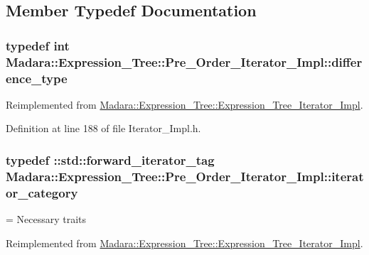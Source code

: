 \subsection{Member Typedef Documentation}
\hypertarget{classMadara_1_1Expression__Tree_1_1Pre__Order__Iterator__Impl_a4c64f0f28e72f46c878f5bae77a83f9a}{
\subsubsection[{difference\_\-type}]{\setlength{\rightskip}{0pt plus 5cm}typedef int {\bf Madara::Expression\_\-Tree::Pre\_\-Order\_\-Iterator\_\-Impl::difference\_\-type}}}
\label{d0/dfb/classMadara_1_1Expression__Tree_1_1Pre__Order__Iterator__Impl_a4c64f0f28e72f46c878f5bae77a83f9a}


Reimplemented from \hyperlink{classMadara_1_1Expression__Tree_1_1Expression__Tree__Iterator__Impl_ae0238cb942a1398b7cd91dffe4c5ba3c}{Madara::Expression\_\-Tree::Expression\_\-Tree\_\-Iterator\_\-Impl}.



Definition at line 188 of file Iterator\_\-Impl.h.

\hypertarget{classMadara_1_1Expression__Tree_1_1Pre__Order__Iterator__Impl_a652d035072052fa7aacf532038ada5ea}{
\subsubsection[{iterator\_\-category}]{\setlength{\rightskip}{0pt plus 5cm}typedef ::std::forward\_\-iterator\_\-tag {\bf Madara::Expression\_\-Tree::Pre\_\-Order\_\-Iterator\_\-Impl::iterator\_\-category}}}
\label{d0/dfb/classMadara_1_1Expression__Tree_1_1Pre__Order__Iterator__Impl_a652d035072052fa7aacf532038ada5ea}


= Necessary traits 



Reimplemented from \hyperlink{classMadara_1_1Expression__Tree_1_1Expression__Tree__Iterator__Impl_a59d9cb2efd705e21684d901de09399c7}{Madara::Expression\_\-Tree::Expression\_\-Tree\_\-Iterator\_\-Impl}.



